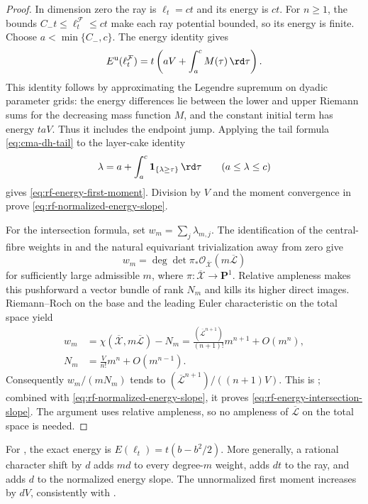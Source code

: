 \begin{proof}
In dimension zero the ray is $\ell_t=ct$ and its energy is $ct$. For $n\geq1$, the bounds $C_-t\leq\ell_t^{\mathcal F}\leq ct$ make each ray potential bounded, so its energy is finite. Choose $a<\min\{C_-,c\}$. The energy identity \cite[Proposition~6.7, pp.~151--152]{RWN14} gives
\[
 E^{\mathrm u}(\ell_t^{\mathcal F})
       =t\left(aV+\int_a^c M(\tau)\,\rd\tau\right).
\]
This identity follows by approximating the Legendre supremum on dyadic parameter grids: the energy differences lie between the lower and upper Riemann sums for the decreasing mass function $M$, and the constant initial term has energy $taV$. Thus it includes the endpoint jump. Applying the tail formula \eqref{eq:cma-dh-tail} to the layer-cake identity
\[
 \lambda=a+\int_a^c\mathbf 1_{\{\lambda\geq\tau\}}\,\rd\tau
                    \qquad(a\leq\lambda\leq c)
\]
gives \eqref{eq:rf-energy-first-moment}. Division by $V$ and the moment convergence in  prove \eqref{eq:rf-normalized-energy-slope}.

For the intersection formula, set $w_m=\sum_j\lambda_{m,j}$. The identification of the central-fibre weights in \cite[Proposition~5.9]{BHJ17} and the natural equivariant trivialization away from zero give
\[
 w_m=\deg\det\pi_*\mathcal O_{\overline{\mathcal X}}
                         (m\overline{\mathcal L})
\]
for sufficiently large admissible $m$, where $\pi:\overline{\mathcal X}\to\mathbf P^1$. Relative ampleness makes this pushforward a vector bundle of rank $N_m$ and kills its higher direct images. Riemann--Roch on the base and the leading Euler characteristic on the total space yield
\[
 \begin{aligned}
 w_m&=\chi(\overline{\mathcal X},m\overline{\mathcal L})-N_m
       =\frac{(\overline{\mathcal L}^{n+1})}{(n+1)!}m^{n+1}
           +O(m^n),\\
 N_m&=\frac{V}{n!}m^n+O(m^{n-1}).
 \end{aligned}
\]
Consequently $w_m/(mN_m)$ tends to $(\overline{\mathcal L}^{n+1})/((n+1)V)$. This is \cite[Proposition~3.12(iii), equation~(3.3), pp.~777--778]{BHJ17}; combined with \eqref{eq:rf-normalized-energy-slope}, it proves \eqref{eq:rf-energy-intersection-slope}. The argument uses relative ampleness, so no ampleness of $\overline{\mathcal L}$ on the total space is needed.
\end{proof}

For , the exact energy is $E(\ell_t)=t(b-b^2/2)$. More generally, a rational character shift by $d$ adds $md$ to every degree-$m$ weight, adds $dt$ to the ray, and adds $d$ to the normalized energy slope. The unnormalized first moment increases by $dV$, consistently with .

